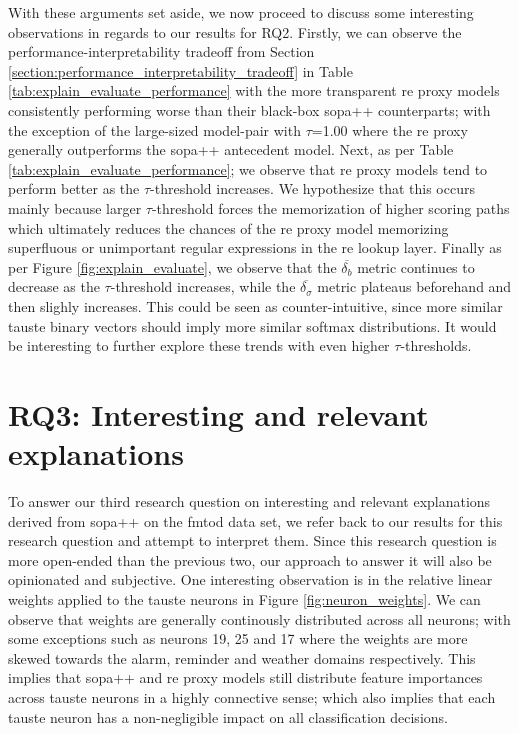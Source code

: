 With these arguments set aside, we now proceed to discuss some interesting
observations in regards to our results for RQ2. Firstly, we can observe the
performance-interpretability tradeoff from Section
\ref{section:performance_interpretability_tradeoff} in Table
\ref{tab:explain_evaluate_performance} with the more transparent \ac{re} proxy models
consistently performing worse than their black-box \ac{sopa}++ counterparts; with the
exception of the large-sized model-pair with $\tau$=1.00 where the \ac{re} proxy
generally outperforms the \ac{sopa}++ antecedent model. Next, as per Table
\ref{tab:explain_evaluate_performance}; we observe that \ac{re} proxy models tend to
perform better as the $\tau$-threshold increases. We hypothesize that this
occurs mainly because larger $\tau$-threshold forces the memorization of higher
scoring paths which ultimately reduces the chances of the \ac{re} proxy model
memorizing superfluous or unimportant regular expressions in the \ac{re} lookup
layer. Finally as per Figure \ref{fig:explain_evaluate}, we
observe that the $\overline{\delta_{b}}$ metric continues to decrease as the
$\tau$-threshold increases, while the $\overline{\delta_{\sigma}}$ metric
plateaus beforehand and then slighly increases. This could be seen as
counter-intuitive, since more similar \ac{tauste} binary vectors should imply more
similar softmax distributions. It would be interesting to further explore these
trends with even higher $\tau$-thresholds.

\section{RQ3: Interesting and relevant explanations}

\label{section:discussion_regex}

To answer our third research question on interesting and relevant explanations
derived from \ac{sopa}++ on the \ac{fmtod} data set, we refer back to our results for this
research question and attempt to interpret them. Since this research question is
more open-ended than the previous two, our approach to answer it will also be
opinionated and subjective. One interesting observation is in the relative
linear weights applied to the \ac{tauste} neurons in Figure \ref{fig:neuron_weights}.
We can observe that weights are generally continously distributed across all
neurons; with some exceptions such as neurons 19, 25 and 17 where the weights
are more skewed towards the alarm, reminder and weather domains respectively.
This implies that \ac{sopa}++ and \ac{re} proxy models still distribute feature
importances across \ac{tauste} neurons in a highly connective sense; which also implies that
each \ac{tauste} neuron has a non-negligible impact on all classification decisions.

